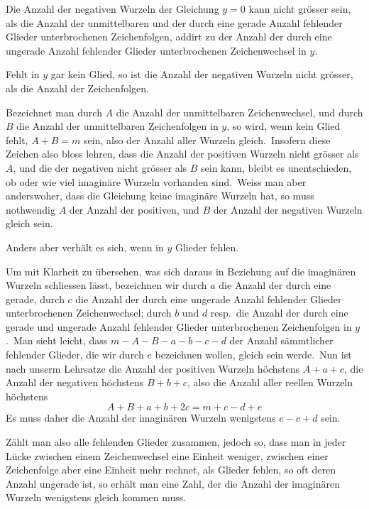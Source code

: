 \documentclass[12pt,a4paper]{article}
\theoremstyle{plain}
\begin{document}
Die Anzahl der negativen Wurzeln der Gleichung $y = 0$ kann nicht grösser
sein, als die Anzahl der unmittelbaren und der durch eine gerade Anzahl fehlender Glieder unterbrochenen Zeichenfolgen, addirt zu der Anzahl der durch eine
ungerade Anzahl fehlender Glieder unterbrochenen Zeichenwechsel in $y$.

Fehlt in $y$ gar kein Glied, so ist die Anzahl der negativen Wurzeln nicht
grösser, als die Anzahl der Zeichenfolgen.

Bezeichnet man durch $A$ die Anzahl der unmittelbaren Zeichenwechsel,
und durch $B$ die Anzahl der unmittelbaren Zeichenfolgen in $y$, so wird, wenn
kein Glied fehlt, $A + B = m$ sein, also der Anzahl aller Wurzeln gleich.\ Insofern diese Zeichen also bloss lehren, dass die Anzahl der positiven Wurzeln nicht
grösser als $A$, und die der negativen nicht grösser als $B$ sein kann, bleibt es
unentschieden, ob oder wie viel imaginäre Wurzeln vorhanden sind.\ Weiss man
aber anderswoher, dass die Gleichung keine imaginäre Wurzeln hat, so muss
nothwendig $A$ der Anzahl der positiven, und $B$ der Anzahl der negativen Wurzeln gleich sein.

Anders aber verhält es sich, wenn in $y$ Glieder fehlen.

Um mit Klarheit zu übersehen, was sich daraus in Beziehung auf die imaginären Wurzeln schliessen lässt, bezeichnen wir durch $a$ die Anzahl der durch eine gerade, durch $c$ die Anzahl der durch eine ungerade Anzahl fehlender Glieder unterbrochenen Zeichenwechsel; durch $b$ und $d$ resp.\ die Anzahl der durch eine gerade und ungerade Anzahl fehlender Glieder unterbrochenen Zeichenfolgen in $y$.\ Man sieht leicht, dass $m - A - B - a - b - c - d$ der Anzahl sämmtlicher fehlender Glieder, die wir durch $e$ bezeichnen wollen, gleich sein werde.\ Nun ist nach unserm Lehrsatze die Anzahl der positiven Wurzeln höchstens $A + a + c$, die Anzahl der negativen höchstens $B + b + c$, also die Anzahl aller reellen Wurzeln höchstens
\[
A + B + a + b + 2c = m + c - d + e
\]
Es muss daher die Anzahl der imaginären Wurzeln wenigstens $e - c + d$ sein.

Zählt man also alle fehlenden Glieder zusammen, jedoch so, dass man in
jeder Lücke zwischen einem Zeichenwechsel eine Einheit weniger, zwischen einer
Zeichenfolge aber eine Einheit mehr rechnet, als Glieder fehlen, so oft deren Anzahl ungerade ist, so erhält man eine Zahl, der die Anzahl der imaginären Wurzeln wenigstens gleich kommen muss.

\newpage
{}
\end{document}
